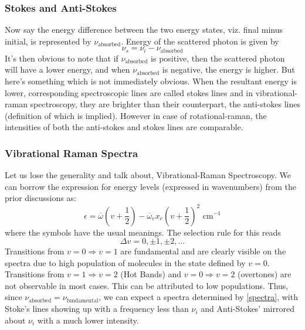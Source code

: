 	\subsubsection*{Stokes and Anti-Stokes}
	Now say the energy difference between the two energy states, viz. final minus initial, is represented by $\nu_{\text{absorbed}}$. Energy of the scattered photon is given by 
	\begin{equation}
		\nu_{s} = \nu_{i} - \nu_{\text{absorbed}}
		\label{spectra}
	\end{equation}
	It's then obvious to note that if $\nu_{\text{absorbed}}$ is positive, then the scattered photon will have a lower energy, and when $\nu_{\text{absorbed}}$ is negative, the energy is higher. But here's something which is not immediately obvious. When the resultant energy is lower, corresponding spectroscopic lines are called stokes lines and in vibrational-raman spectroscopy, they are brighter than their counterpart, the anti-stokes lines (definition of which is implied). However in case of rotational-raman, the intensities of both the anti-stokes and stokes lines are comparable.
	
	\subsubsection*{Vibrational Raman Spectra}
	Let us lose the generality and talk about, Vibrational-Raman Spectroscopy. We can borrow the expression for energy levels (expressed in wavenumbers) from the prior discussions as:
	\begin{equation}
		\epsilon = \overline{\omega} (v + \frac{1}{2}) - \overline{\omega}_{e}x_{e}(v + \frac{1}{2})^{2} \,\, \text{cm}^{-1}
	\end{equation}
	where the symbols have the usual meanings. The selection rule for this reads
	\begin{equation}
		\Delta v = 0,\pm 1,\pm 2,...
	\end{equation}
	Transitions from $v=0 \Rightarrow v=1$ are fundamental and are clearly visible on the spectra due to high population of molecules in the state defined by $v=0$. Transitions from $v=1 \Rightarrow v=2$ (Hot Bands) and $v=0 \Rightarrow v=2$ (overtones) are not observable in most cases. This can be attributed to low populations. 
	Thus, since $\nu_{\text{absorbed}}=\nu_{\text{fundamental}}$, we can expect a spectra determined by \autoref{spectra}, with Stoke's lines showing up with a frequency less than $\nu_{i}$ and Anti-Stokes' mirrored about $\nu_{i}$ with a much lower intensity.

